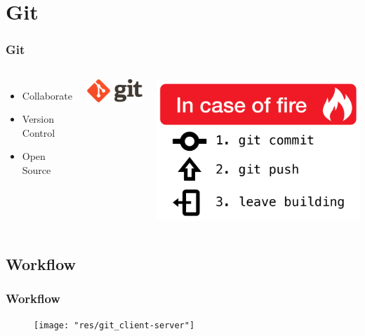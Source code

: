 
    
    \section{Git}
	\begin{frame}
		\frametitle{Git}
		\begin{columns}[c]
        		\begin{itemize}
					\item Collaborate
                    \item Version Control
                    \item Open Source
          		\end{itemize}
            	\centering
				\includegraphics[width=.7\linewidth,]{res/git}

				\vspace{1cm} %

				\includegraphics[width=.7\linewidth]{res/fire}
        \end{columns}
	\end{frame}
    
    \subsection{Workflow}
    \begin{frame}[allowframebreaks=10] %
		\frametitle{Workflow}
        \begin{figure}
        	\centering
        	\texttt{[image: "res/git\_client-server"]} \\
        \end{figure}
	\end{frame}
	
